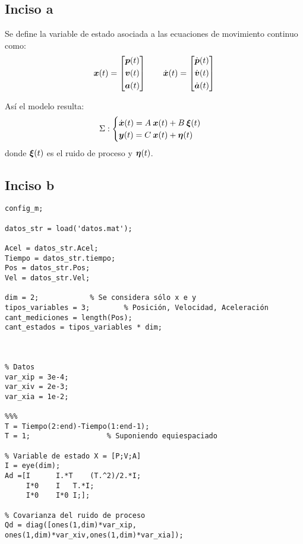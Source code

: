 \subsection{Inciso a}

	Se define la variable de estado asociada a las ecuaciones de movimiento continuo como:
		\begin{equation*}
			\vect{x}(t) = \begin{bmatrix} \vect{p}(t) \\[0.3em] \vect{v}(t) \\[0.3em] \vect{a}(t) \end{bmatrix} \qquad%
			\dot{\vect{x}}(t) = \begin{bmatrix} \dot{\vect{p}}(t) \\[0.3em] \dot{\vect{v}}(t) \\[0.3em] \dot{\vect{a}}(t) \end{bmatrix}
		\end{equation*}

	Así el modelo resulta:
		\begin{equation*}
			\Sigma:
			\begin{cases}
				\dot{\boldsymbol{x}}(t) = A\: \boldsymbol{x}(t) + B \: \boldsymbol{\xi}(t) \\
				\boldsymbol{y}(t) = C\: \boldsymbol{x}(t) + \boldsymbol{\eta}(t)
			\end{cases}
		\end{equation*}
	donde $\boldsymbol{\xi}(t)$ es el ruido de proceso y $\boldsymbol{\eta}(t)$.


\subsection{Inciso b}

	\begin{lstlisting}
config_m;

datos_str = load('datos.mat');

Acel = datos_str.Acel;
Tiempo = datos_str.tiempo;
Pos = datos_str.Pos;
Vel = datos_str.Vel;

dim = 2;			% Se considera sólo x e y
tipos_variables = 3;		% Posición, Velocidad, Aceleración
cant_mediciones = length(Pos);
cant_estados = tipos_variables * dim;



% Datos
var_xip = 3e-4;
var_xiv = 2e-3;
var_xia = 1e-2;

%%%
T = Tiempo(2:end)-Tiempo(1:end-1);	
T = 1;					% Suponiendo equiespaciado

% Variable de estado X = [P;V;A]
I = eye(dim);
Ad =[I		I.*T	(T.^2)/2.*I;
     I*0	I	T.*I;
     I*0	I*0	I;];

% Covarianza del ruido de proceso
Qd = diag([ones(1,dim)*var_xip, ones(1,dim)*var_xiv,ones(1,dim)*var_xia]);
	\end{lstlisting}





	
		
